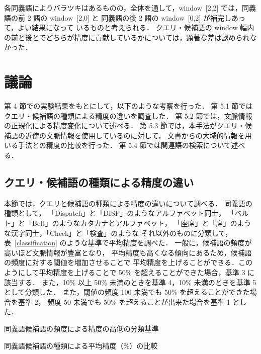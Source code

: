 \documentclass[japanese]{jnlp_1.4}
\begin{document}
各同義語によりバラツキはあるものの，全体を通して，window~[2,2] では，同義語の前 2 語の window~[2,0] と
同義語の後 2 語の window~[0,2] が補完しあって，よい結果になって
いるものと考えられる．
クエリ・候補語の window 幅内の前と後とでどちらが精度に貢献しているかについては，顕著な差は認められなかった．




\section{議論}

第 4 節での実験結果をもとにして，以下のような考察を行った．
第 5.1 節ではクエリ・候補語の種類による精度の違いを調査した．
第 5.2 節では，文脈情報の正規化による精度変化について述べる．
第 5.3 節では，本手法がクエリ・候補語の近傍の文脈情報を使用しているのに対して，
文書からの大域的情報を用いる手法との精度の比較を行った．
第 5.4 節では関連語の検索について述べる．


\subsection{クエリ・候補語の種類による精度の違い}

本節では，クエリと候補語の種類による精度の違いについて調べる．
同義語の種類として，
「Dispatch」と「DISP」のようなアルファベット同士，
「ベルト」と「Belt」のようなカタカナとアルファベット，
「座席」と「席」のような漢字同士，「Check」と「検査」のような
それ以外のものに分類して，表~\ref{classification} のような基準で平均精度を調べた．
一般に，候補語の頻度が高いほど文脈情報が豊富となり，
平均精度も高くなる傾向にあるため，候補語の頻度に対する閾値を増加させることで
平均精度を上げることができる．このようにして平均精度を上げることで 50\% を超えることができた場合，基準 3 に該当する．
また，10\% 以上 50\% 未満のときを基準 4，10\% 未満のときを基準 5 として分類した．
また，閾値の頻度 100 未満でも 50\% を超えることができた場合を基準 2，
頻度 50 未満でも 50\% を超えることが出来た場合を基準 1 とした．

\begin{table}[b]
\begin{center}
\caption{同義語候補語の頻度による精度の高低の分類基準}
\label{classification}

\end{center}
\end{table}
\begin{table}[b]
\begin{center}
\caption{同義語候補語の種類による平均精度（\%）の比較}
\label{variation}

\end{center}
\end{table}
\end{document}

